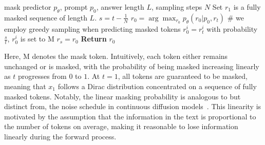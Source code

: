 \documentclass{article}
\begin{document}
\begin{algorithm}[t!]
    \caption{Random Remasking Strategy of LLaDA}
    \label{alg:reverse}
    \begin{algorithmic}[1]
        \REQUIRE mask predictor $p_{\theta}$, prompt $p_0$, answer length $L$, sampling steps $N$
        \STATE Set \( r_1 \) is a fully masked sequence of length \( L \).
            \STATE $s = t - \frac{1}{N}$
            \STATE $r_0 = \arg\max_{r_0} p_{\theta}(r_0|p_0, r_t)$ \hfill \# we employ greedy sampling when predicting masked tokens
                    \STATE $r_0^i = r_t^i$
                \ELSE
                    \STATE with probability \( \frac{s}{t} \), \( r_0^i \) is set to \( \textrm{M} \)
                \ENDIF
            \ENDFOR
        \STATE $r_s = r_0$
        \ENDFOR
        \STATE \textbf{Return} $r_0$
    \end{algorithmic}
\end{algorithm}


Here, \( \textrm{M} \) denotes the mask token. Intuitively, each token either remains unchanged or is masked, with the probability of being masked increasing linearly as \( t \) progresses from \( 0 \) to \( 1 \). At \( t = 1 \), all tokens are guaranteed to be masked, meaning that \( x_1 \) follows a Dirac distribution concentrated on a sequence of fully masked tokens. Notably, the linear masking probability is analogous to but distinct from, the noise schedule in continuous diffusion models~\cite{sohl2015deep,ho2020denoising,song2020score}. This linearity is motivated by the assumption that the information in the text is proportional to the number of tokens on average, making it reasonable to lose information linearly during the forward process. 
\end{document}
